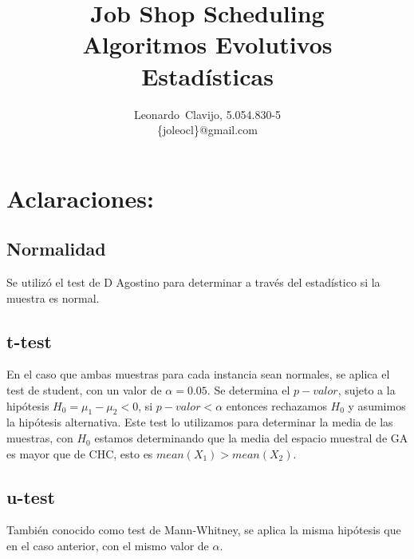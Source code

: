 \documentclass[a4paper,11pt]{article}
\title{}
\author{}
\begin{document}
\title{Job Shop Scheduling\\ Algoritmos Evolutivos\\ Estadísticas}


\author{
Leonardo~Clavijo, 5.054.830-5\\
\{joleocl\}@gmail.com
}


\maketitle

\newpage

\tableofcontents
\newpage
 
\section{Aclaraciones:}

\subsection{Normalidad}
Se utilizó el test de D Agostino para determinar a través del estadístico si la muestra es normal.

\subsection{t-test}
En el caso que ambas muestras para cada instancia sean normales, se aplica el test de student, con un valor de $\alpha =0.05$. Se determina el $p-valor$, sujeto a la hipótesis $H_{0}=\mu_{1}-\mu_{2}<0$, si $p-valor < \alpha$ entonces rechazamos $H_{0}$ y asumimos la hipótesis alternativa.
Este test lo utilizamos para determinar la media de las muestras, con $H_0$ estamos determinando que la media del espacio muestral de GA es mayor que de CHC, esto es $mean(X_1)>mean(X_2)$.
\subsection{u-test}
También conocido como test de Mann-Whitney, se aplica la misma hipótesis que en el caso anterior, con el mismo valor de $\alpha$. 

\newpage

\end{document}
